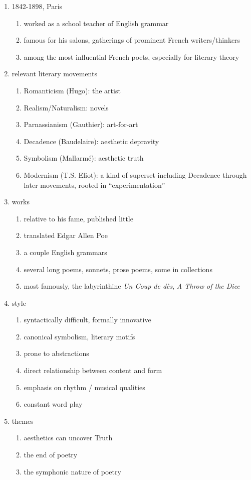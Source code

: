\documentclass[12pt]{article}
\begin{document}
\begin{enumerate}
\item 1842-1898, Paris
    \begin{enumerate}
    \item worked as a school teacher of English grammar
    \item famous for his salons, gatherings of prominent French writers/thinkers
    \item among the most influential French poets, especially for literary theory
    \end{enumerate}
\item relevant literary movements
    \begin{enumerate}
    \item Romanticism (Hugo): the artist
    \item Realism/Naturalism: novels
    \item Parnassianism (Gauthier): art-for-art
    \item Decadence (Baudelaire): aesthetic depravity
    \item Symbolism (Mallarm\'{e}): aesthetic truth
    \item Modernism (T.S. Eliot): a kind of superset including Decadence through later movements, rooted in ``experimentation''
    \end{enumerate}
\item works
    \begin{enumerate}
    \item relative to his fame, published little
    \item translated Edgar Allen Poe
    \item a couple English grammars
    \item several long poems, sonnets, prose poems, some in collections
    \item most famously, the labyrinthine \textit{Un Coup de d\`{e}s}, \textit{A Throw of the Dice}
    \end{enumerate}
\item style
    \begin{enumerate}
    \item syntactically difficult, formally innovative
    \item canonical symbolism, literary motifs
    \item prone to abstractions 
    \item direct relationship between content and form
    \item emphasis on rhythm / musical qualities
    \item constant word play
    \end{enumerate}
\item themes
    \begin{enumerate}
    \item aesthetics can uncover Truth
    \item the end of poetry
    \item the symphonic nature of poetry
    \end{enumerate}
\end{enumerate}
\end{document}
